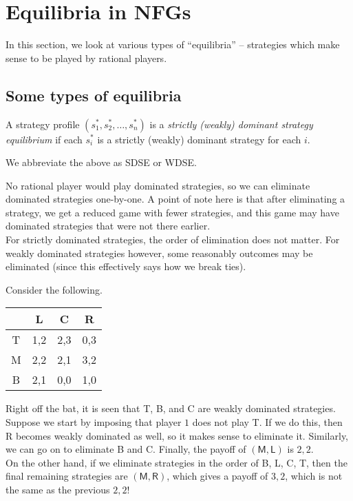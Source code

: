 \section{Equilibria in NFGs}

	In this section, we look at various types of ``equilibria'' -- strategies which make sense to be played by rational players.

\subsection{Some types of equilibria}

	\begin{fdef}
		A strategy profile $(s_1^*,s_2^*,\ldots,s_n^*)$ is a \emph{strictly (weakly) dominant strategy equilibrium} if each $s_i^*$ is a strictly (weakly) dominant strategy for each $i$.
	\end{fdef}
	We abbreviate the above as SDSE or WDSE.

	No rational player would play dominated strategies, so we can eliminate dominated strategies one-by-one. A point of note here is that after eliminating a strategy, we get a reduced game with fewer strategies, and this game may have dominated strategies that were not there earlier.\\
	For strictly dominated strategies, the order of elimination does not matter. For weakly dominated strategies however, some reasonably outcomes may be eliminated (since this effectively says how we break ties).

	\begin{fex}
		\label{example: order of eliminating dominated strategies}
		Consider the following.
		\begin{center}
		\begin{tabular}{|c||c|c|c|}
			\hline
			& \textsf{L} & \textsf{C} & \textsf{R} \\
			\hline\hline
			\textsf{T} & 1,2 & 2,3 & 0,3 \\
			\hline
			\textsf{M} & 2,2 & 2,1 & 3,2 \\
			\hline
			\textsf{B} & 2,1 & 0,0 & 1,0 \\ \hline
		\end{tabular}
		\end{center}


		Right off the bat, it is seen that \textsf{T}, \textsf{B}, and \textsf{C} are weakly dominated strategies. Suppose we start by imposing that player $1$ does not play \textsf{T}. If we do this, then \textsf{R} becomes weakly dominated as well, so it makes sense to eliminate it. Similarly, we can go on to eliminate \textsf{B} and \textsf{C}. Finally, the payoff of $(\mathsf{M},\mathsf{L})$ is $2,2$.\\
		On the other hand, if we eliminate strategies in the order of \textsf{B}, \textsf{L}, \textsf{C}, \textsf{T}, then the final remaining strategies are $(\mathsf{M},\mathsf{R})$, which gives a payoff of $3,2$, which is not the same as the previous $2,2$!
	\end{fex}


